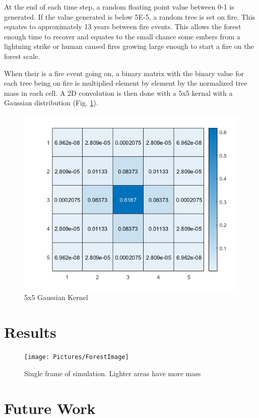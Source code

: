 \documentclass[ aps, pra, reprint, notitlepage ]{revtex4-1}
\begin{document}
At the end of each time step, a random floating point value between 0-1 is generated. If the value generated is below 5E-5, a random tree is set on fire. This equates to approximately 13 years between fire events. This allows the forest enough time to recover and equates to the small chance some embers from a lightning strike or human caused fires growing large enough to start a fire on the forest scale.

When their is a fire event going on, a binary matrix with the binary value for each tree being on fire is multiplied element by element by the normalized tree mass in each cell. A 2D convolution is then done with a 5x5 kernal with a Gaussian distribution (Fig. \ref{GuassDist}).
	
\begin{figure}[ht]
	\includegraphics[scale=0.7]{Pictures/Guassian}
	\caption{\label{GuassDist} 5x5 Gaussian Kernel}
\end{figure}	



\section{\label{Results}Results}

\begin{figure}[ht]
	\texttt{[image: Pictures/ForestImage]}
	\caption{\label{SimulationSlice} Single frame of simulation. Lighter areas have more mass}
\end{figure}


\section{\label{FutureWork}Future Work}
\end{document}
